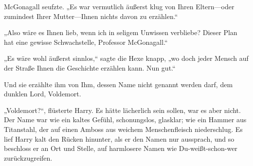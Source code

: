McGonagall seufzte. „Es war vermutlich äußerst klug von Ihren Eltern—oder zumindest Ihrer Mutter—Ihnen nichts davon zu erzählen.“

„Also wäre es Ihnen lieb, wenn ich in seligem Unwissen verbliebe? Dieser Plan hat eine gewisse Schwachstelle, Professor McGonagall.“

„Es wäre wohl äußerst sinnlos,“ sagte die Hexe knapp, „wo doch jeder Mensch auf der Straße Ihnen die Geschichte erzählen kann. Nun gut.“

Und sie erzählte ihm von Ihm, dessen Name nicht genannt werden darf, dem dunklen Lord, Voldemort.

„Voldemort?“, flüsterte Harry. Es hätte lächerlich sein sollen, war es aber nicht. Der Name war wie ein kaltes Gefühl, schonungslos, glasklar; wie ein Hammer aus Titanstahl, der auf einen Amboss aus weichem Menschenfleisch niederschlug. Es lief Harry kalt den Rücken hinunter, als er den Namen nur aussprach, und so beschloss er an Ort und Stelle, auf harmlosere Namen wie Du-weißt-schon-wer zurückzugreifen.

